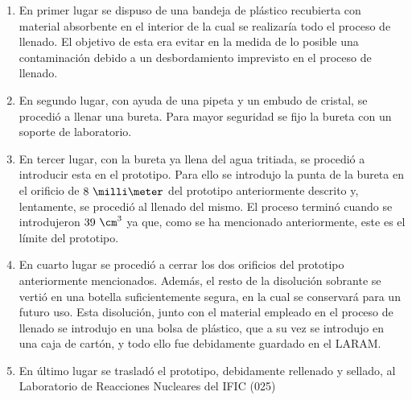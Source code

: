 \begin{enumerate}
\item{} En primer lugar se dispuso de una bandeja de plástico recubierta con material absorbente en el interior de la cual se realizaría todo el proceso de llenado. El objetivo de esta era evitar en la medida de lo posible una contaminación debido a un desbordamiento imprevisto en el proceso de llenado. 

\item{} En segundo lugar, con ayuda de una pipeta y un embudo de cristal, se procedió a llenar una bureta. Para mayor seguridad se fijo la bureta con un soporte de laboratorio. 

\item{} En tercer lugar, con la bureta ya llena del agua tritiada, se procedió a introducir esta en el prototipo. Para ello se introdujo la punta  de la bureta en el orificio de $8~\milli\meter$ del prototipo anteriormente descrito y, lentamente, se procedió al llenado del mismo. El proceso terminó cuando se introdujeron $39~\cm^3$ ya que, como se ha mencionado anteriormente, este es el límite del prototipo.

\item{} En cuarto lugar se procedió a cerrar los dos orificios del prototipo anteriormente mencionados. Además, el resto de la disolución sobrante se vertió en una botella suficientemente segura, en la cual se conservará para un futuro uso. Esta disolución, junto con el material empleado en el proceso de llenado se introdujo en una bolsa de plástico, que a su vez  se introdujo en una caja de cartón, y todo ello fue debidamente guardado en el LARAM.

\item{} En último lugar se trasladó el prototipo, debidamente rellenado y sellado, al Laboratorio de Reacciones Nucleares del IFIC (025)

\end{enumerate}

